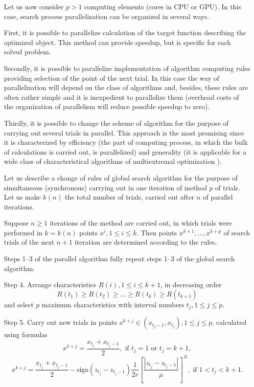 \documentclass[smallcondensed]{svjour3}     %
\begin{document}
Let us now consider $p>1$ computing elements (cores in CPU or GPU). In this case, search process parallelization can be organized in several ways.

First, it is possible to parallelize calculation of the target function describing the optimized object. This method can provide speedup, but is specific for each solved problem.

Secondly, it is possible to parallelize implementation of algorithm computing rules providing selection of the point of the next trial. In this case the way of parallelization will depend on the class of algorithms and, besides, these rules are often rather simple and it is inexpedient to parallelize them (overhead costs of the organization of parallelism will reduce possible speedup to zero).

Thirdly, it is possible to change the scheme of algorithm for the purpose of carrying out several trials in parallel. This approach is the most promising since it is characterized by efficiency (the part of computing process, in which the bulk of calculations is carried out, is parallelized) and generality (it is applicable for a wide class of characteristical algorithms of multiextremal optimization \cite{RefGrishagin1997}).

Let us describe a change of rules of global search algorithm for the purpose of simultaneous (synchronous) carrying out in one iteration of method $p$ of trials. Let us make $k(n)$ the total number of trials, carried out after $n$ of parallel iterations.

Suppose $n\geq 1$  iterations of the method are carried out, in which trials were performed in $k=k(n)$ points $x^i,1\leq i \leq k$. Then points $x^{k+1},\dots,x^{k+p}$  of search trials of the next $n+1$ iteration are determined according to the rules.

Steps 1--3 of the parallel algorithm fully repeat steps 1--3 of the global search algorithm.

Step 4. Arrange characteristics  $R(i), 1 \leq i \leq k+1$, in decreasing order 
\begin{equation}\label{eq:21}
R(t_1)\geq R(t_2)\geq \dots \geq R(t_{k}) \geq R(t_{k+1})
\end{equation}
and select $p$ maximum characteristics with interval numbers $t_j, 1\leq j \leq p$.

Step 5. Carry out new trials in points $x^{k+j}\in(x_{t_j-1},x_{t_j}), 1\leq j\leq p$, calculated using formulas
\[
x^{k+j} = \frac{x_{t_j}+x_{t_j-1}}{2}, \textrm{ if } t_j=1 \textrm{ or } t_j=k+1,
\]
\[
x^{k+j} = \frac{x_{t_j}+x_{t_j-1}}{2} - \mathrm{sign}(z_{t_j}-z_{t_j-1})\frac{1}{2r}\left[\frac{\left|z_{t_j}-z_{t_j-1}\right|}{\mu}\right]^N, \textrm{ if } 1<t_j<k+1.
\]
\end{document}
